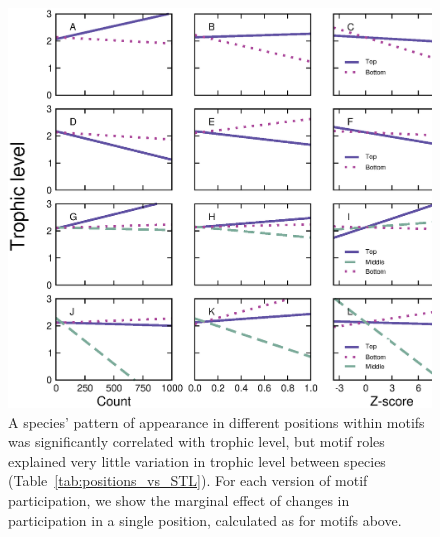 \documentclass[12pt]{article}
\begin{document}
\begin{spacing}{2.0}
		    \begin{figure}[ht!]
		        \centering
		        \includegraphics[width=\textwidth]{figures/positions_vs_TL.eps}
		        \caption{A species' pattern of appearance in different positions within motifs was significantly correlated with trophic level, but motif roles explained very little variation in trophic level between species (Table~\ref{tab:positions_vs_STL}). For each version of motif participation, we show the marginal effect of changes in participation in a single position, calculated as for motifs above.}
		        \label{fig:positions_TL}
			    \end{figure}



\end{spacing}
\end{document}
